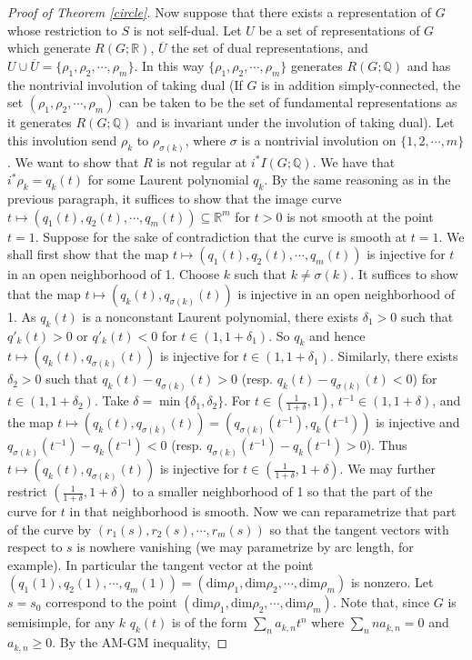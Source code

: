 \documentclass[11pt]{amsart}
\theoremstyle{plain}
\theoremstyle{definition}
\begin{document}
\begin{proof}[Proof of Theorem \ref{circle}]
Now suppose that there exists a representation of $G$ whose restriction to $S$ is not self-dual. Let $U$ be a set of representations of $G$ which generate $R(G; \mathbb{R})$, $\overline{U}$ the set of dual representations, and $U\cup \overline{U}=\{\rho_1, \rho_2, \cdots, \rho_m\}$. In this way $\{\rho_1, \rho_2, \cdots, \rho_m\}$ generates $R(G; \mathbb{Q})$ and has the nontrivial involution of taking dual (If $G$ is in addition simply-connected, the set $(\rho_1, \rho_2, \cdots, \rho_m)$ can be taken to be the set of fundamental representations as it generates $R(G; \mathbb{Q})$ and is invariant under the involution of taking dual). Let this involution send $\rho_k$ to $\rho_{\sigma(k)}$, where $\sigma$ is a nontrivial involution on $\{1, 2, \cdots, m\}$. We want to show that $R$ is not regular at $i^*I(G; \mathbb{Q})$. We have that $i^*\rho_k=q_k(t)$ for some Laurent polynomial $q_k$. By the same reasoning as in the previous paragraph, it suffices to show that the image curve $t\mapsto (q_1(t), q_2(t), \cdots, q_m(t))\subseteq \mathbb{R}^m$ for $t>0$ is not smooth at the point $t=1$. Suppose for the sake of contradiction that the curve is smooth at $t=1$. We shall first show that the map $t\mapsto (q_1(t), q_2(t), \cdots, q_m(t))$ is injective for $t$ in an open neighborhood of 1. Choose $k$ such that $k\neq \sigma(k)$. It suffices to show that the map $t\mapsto(q_k(t), q_{\sigma(k)}(t))$ is injective in an open neighborhood of 1. As $q_k(t)$ is a nonconstant Laurent polynomial, there exists $\delta_1>0$ such that $q'_k(t)>0$ or $q'_k(t)<0$ for $t\in(1, 1+\delta_1)$. So $q_k$ and hence $t\mapsto(q_k(t), q_{\sigma(k)}(t))$ is injective for $t\in(1, 1+\delta_1)$. Similarly, there exists $\delta_2>0$ such that $q_k(t)-q_{\sigma(k)}(t)>0$ (resp. $q_k(t)-q_{\sigma(k)}(t)<0$) for $t\in(1, 1+\delta_2)$. Take $\delta=\min\{\delta_1, \delta_2\}$. For $\displaystyle t\in\left(\frac{1}{1+\delta}, 1\right)$, $t^{-1}\in(1, 1+\delta)$, and the map $t\mapsto(q_k(t), q_{\sigma(k)}(t))=(q_{\sigma(k)}(t^{-1}), q_k(t^{-1}))$ is injective and $q_{\sigma(k)}(t^{-1})-q_k(t^{-1})<0$ (resp. $q_{\sigma(k)}(t^{-1})-q_k(t^{-1})>0$). Thus $t\mapsto (q_k(t), q_{\sigma(k)}(t))$ is injective for $\displaystyle t\in\left(\frac{1}{1+\delta}, 1+\delta\right)$. We may further restrict $\displaystyle\left(\frac{1}{1+\delta}, 1+\delta\right)$ to a smaller neighborhood of 1 so that the part of the curve for $t$ in that neighborhood is smooth. Now we can reparametrize that part of the curve by $(r_1(s), r_2(s), \cdots, r_m(s))$ so that the tangent vectors with respect to $s$ is nowhere vanishing (we may parametrize by arc length, for example). In particular the tangent vector at the point $(q_1(1), q_2(1), \cdots, q_m(1))=(\text{dim}\rho_1, \text{dim}\rho_2, \cdots, \text{dim}\rho_m)$ is nonzero. Let $s=s_0$ correspond to the point $(\text{dim}\rho_1, \text{dim}\rho_2, \cdots, \text{dim}\rho_m)$. Note that, since $G$ is semisimple, for any $k$ $q_k(t)$ is of the form $\displaystyle\sum_n a_{k, n}t^n$ where $\displaystyle\sum_n na_{k, n}=0$ and $a_{k, n}\geq 0$. By the AM-GM inequality, 

\end{proof}
\end{document}
